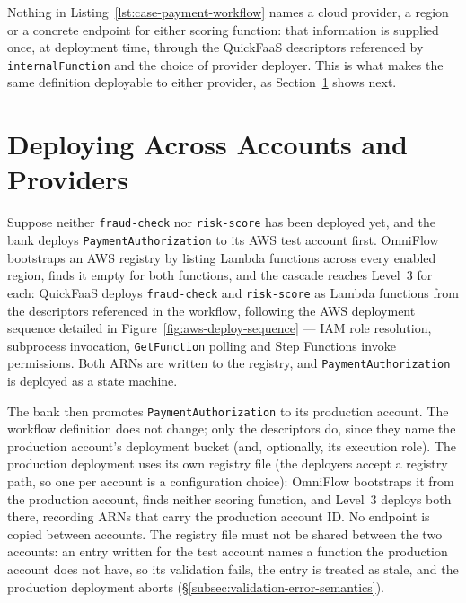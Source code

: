Nothing in Listing~\ref{lst:case-payment-workflow} names a cloud provider, a region or a concrete
endpoint for either scoring function: that information is supplied once, at deployment time,
through the QuickFaaS descriptors referenced by \texttt{internalFunction} and the choice of
provider deployer. This is what makes the same definition deployable to either provider, as
Section~\ref{sec:case-deployment} shows next.

\section{Deploying Across Accounts and Providers}
\label{sec:case-deployment}

Suppose neither \texttt{fraud-check} nor \texttt{risk-score} has been deployed yet, and the bank
deploys \texttt{PaymentAuthorization} to its AWS test account first. OmniFlow bootstraps an AWS registry by
listing Lambda functions across every enabled region, finds it empty for both functions, and the
cascade reaches Level~3 for each: QuickFaaS deploys \texttt{fraud-check} and \texttt{risk-score}
as Lambda functions from the descriptors referenced in the workflow, following the AWS deployment
sequence detailed in Figure~\ref{fig:aws-deploy-sequence} --- IAM role resolution, subprocess
invocation, \texttt{GetFunction} polling and Step Functions invoke permissions. Both ARNs are
written to the registry, and \texttt{PaymentAuthorization} is deployed as a state machine.

The bank then promotes \texttt{PaymentAuthorization} to its production account. The workflow
definition does not change; only the descriptors do, since they name the production account's
deployment bucket (and, optionally, its execution role). The production deployment uses its own
registry file (the deployers accept a registry path, so one per account is a configuration
choice): OmniFlow bootstraps it from the production account, finds neither scoring function, and
Level~3 deploys both there, recording ARNs that carry the production account ID. No endpoint is
copied between accounts. The registry file must not be shared between the two accounts: an entry
written for the test account names a function the production account does not have, so its
validation fails, the entry is treated as stale, and the production deployment aborts
(\S\ref{subsec:validation-error-semantics}).

